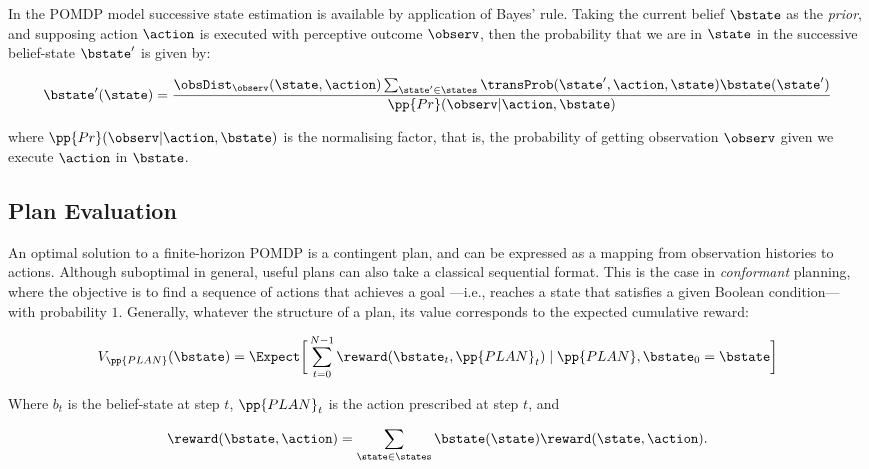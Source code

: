 In the POMDP model successive state estimation is available by
application of Bayes' rule.  Taking the current belief $\bstate$ as
the {\em prior}, and supposing action $\action$ is executed with
perceptive outcome $\observ$, then the probability that we are in
$\state$ in the successive belief-state $\bstate'$ is given by:

\begin{equation}\label{eq:revision}
\bstate'(\state) = \frac{\obsDist_\observ(\state, \action)
  \sum_{\state'\in \states} \transProb(\state', \action, \state) \bstate(\state') }{\pp{Pr}(\observ | \action, \bstate)}
\end{equation}

\noindent where $\pp{Pr}(\observ | \action, \bstate)$ is the
normalising factor, that is, the probability of getting observation
$\observ$ given we execute $\action$ in $\bstate$.

\subsection{Plan Evaluation}

An optimal solution to a finite-horizon POMDP is a contingent plan,
and can be expressed as a mapping from observation histories to
actions. Although suboptimal in general, useful plans can also take a
classical sequential format. This is the case in {\em conformant}
planning, where the objective is to find a sequence of actions that
achieves a goal ---i.e., reaches a state that satisfies a given
Boolean condition--- with probability $1$.  Generally, whatever the
structure of a plan, its value corresponds to the expected cumulative
reward:


\begin{equation}\label{eq:expectedvalue}
V_{\pp{PLAN}}(\bstate) = \Expect \bigg{[} 
\sum_{t=0}^{N-1}  \reward(\bstate_t, \pp{PLAN}_t) \mid \pp{PLAN}, \bstate_0 = \bstate \bigg{]}
\end{equation}

\noindent Where $b_t$ is the belief-state at step $t$, $\pp{PLAN}_t$ is
the action prescribed at step $t$, and

\[\reward(\bstate, \action) = \sum_{\state \in \states}
\bstate(\state)\reward(\state, \action).\] 


